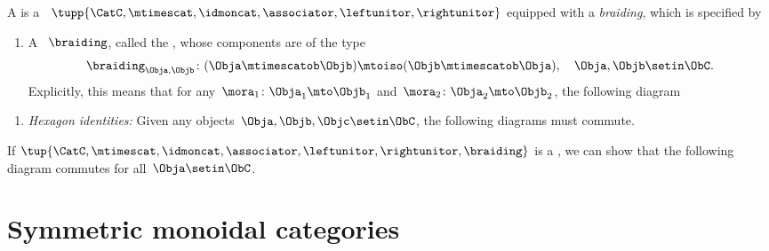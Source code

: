 

\begin{ctdefinition}
    \label{def:braided-monoidal-category}
    A  is a ~$\tupp{\CatC, {{\mtimescat}}, \idmoncat, \associator, \leftunitor, \rightunitor}$ equipped with a \emph{braiding}, which is specified by

    \constit
    \begin{enumerate}
        \item A ~$\braiding$, called the , whose components are of the type \label{def:braiding}
              \begin{equation}
                  \label{eq:braiding_symmetry}
                  \braiding_{\Obja,\Objb}\colon (\Obja\mtimescatob \Objb)\mtoiso (\Objb\mtimescatob \Obja), \quad \Obja,\Objb \setin \ObC.
              \end{equation}
              Explicitly, this means that for any~$\mora_1\colon \Obja_1\mto \Objb_1$ and~$\mora_2\colon \Obja_2\mto \Objb_2$, the following diagram
    \end{enumerate}

    \condit
    \begin{enumerate}
        \item \emph{Hexagon identities:} Given any objects~$\Obja,\Objb,\Objc\setin \ObC$, the following diagrams must commute.
    \end{enumerate}
\end{ctdefinition}

\begin{remark}
    If $\tup{\CatC,{{\mtimescat}}, \idmoncat, \associator, \leftunitor, \rightunitor, \braiding}$ is a , we can show that the following diagram commutes for all~$\Obja \setin \ObC$.
\end{remark}

\section{Symmetric monoidal categories}

